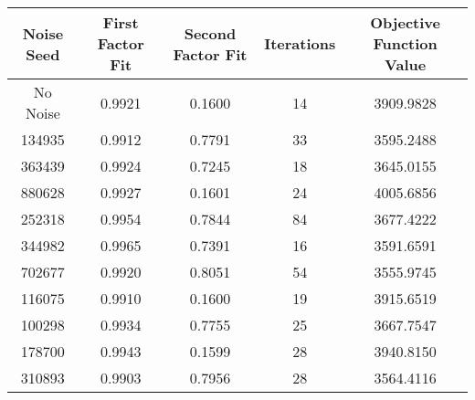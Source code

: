 \begin{tabular}{ccccc}
   
Noise Seed & First Factor Fit & Second Factor Fit & Iterations & Objective Function Value \\
 \hline
No Noise & 0.9921 & 0.1600 &    14 & 3909.9828 \\ 
  134935 & 0.9912 & 0.7791 &    33 & 3595.2488 \\ 
  363439 & 0.9924 & 0.7245 &    18 & 3645.0155 \\ 
  880628 & 0.9927 & 0.1601 &    24 & 4005.6856 \\ 
  252318 & 0.9954 & 0.7844 &    84 & 3677.4222 \\ 
  344982 & 0.9965 & 0.7391 &    16 & 3591.6591 \\ 
  702677 & 0.9920 & 0.8051 &    54 & 3555.9745 \\ 
  116075 & 0.9910 & 0.1600 &    19 & 3915.6519 \\ 
  100298 & 0.9934 & 0.7755 &    25 & 3667.7547 \\ 
  178700 & 0.9943 & 0.1599 &    28 & 3940.8150 \\ 
  310893 & 0.9903 & 0.7956 &    28 & 3564.4116 \\ 
  \end{tabular}
